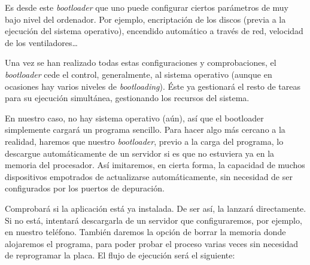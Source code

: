\documentclass[../main.tex]{subfiles}
\begin{document}
        Es desde este \emph{bootloader} que uno puede configurar ciertos parámetros de muy bajo nivel del ordenador. Por ejemplo, encriptación de los discos (previa a la ejecución del sistema operativo), encendido automático a través de red, velocidad de los ventiladores\dots

        Una vez se han realizado todas estas configuraciones y comprobaciones, el \emph{bootloader} cede el control, generalmente, al sistema operativo (aunque en ocasiones hay varios niveles de \emph{bootloading}). Éste ya gestionará el resto de tareas para su ejecución simultánea, gestionando los recursos del sistema.

        En nuestro caso, no hay sistema operativo (aún), así que el bootloader simplemente cargará un programa sencillo. Para hacer algo más cercano a la realidad, haremos que nuestro \emph{bootloader}, previo a la carga del programa, lo descargue automáticamente de un servidor si es que no estuviera ya en la memoria del procesador. Así imitaremos, en cierta forma, la capacidad de muchos dispositivos empotrados de actualizarse automáticamente, sin necesidad de ser configurados por los puertos de depuración.

        Comprobará si la aplicación está ya instalada. De ser así, la lanzará directamente. Si no está, intentará descargarla de un servidor que configuraremos, por ejemplo, en nuestro teléfono. También daremos la opción de borrar la memoria donde alojaremos el programa, para poder probar el proceso varias veces sin necesidad de reprogramar la placa. El flujo de ejecución será el siguiente:
\end{document}
